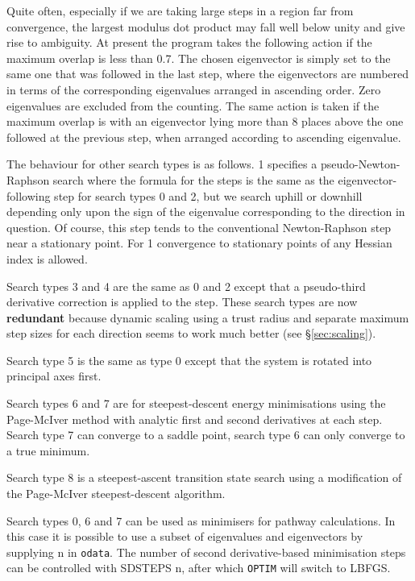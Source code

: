 {{{Quite often, especially if we are taking large steps in a region far from convergence,
the largest modulus dot product may fall well below unity and give rise to ambiguity.
At present the program takes the following action if the maximum overlap is less than
0.7. The chosen eigenvector is simply set to the same one that was followed in the last
step, where the eigenvectors are numbered in terms of the corresponding eigenvalues arranged in
ascending order. Zero eigenvalues are excluded from the counting. The same action is
taken if the maximum overlap is with an eigenvector lying more than 8 places above
the one followed at the previous step, when arranged according to ascending eigenvalue.

The behaviour for other search types is as follows.  1
specifies a pseudo-Newton-Raphson search where the formula for the steps is the same
as the eigenvector-following step for search types 0 and 2, but we search uphill or
downhill depending only upon the sign of the eigenvalue corresponding to the direction
in question.\cite{wales94a}
Of course, this step tends to the conventional Newton-Raphson step
near a stationary point. For  1 convergence to stationary points of any Hessian 
index is allowed.

Search types 3 and 4 are the same as 0 and 2 except that a pseudo-third derivative
correction is applied to the step\cite{wales94a}. These search types are now {\bf redundant}
because dynamic scaling using a trust radius and separate maximum step sizes for each
direction seems to work much better (see \S\ref{sec:scaling}).

Search type 5 is the same as type 0 except that the system is rotated into principal
axes first.

Search types 6 and 7 are for steepest-descent energy minimisations using the Page-McIver
method\cite{pagem88} with analytic first and second derivatives at each step. 
Search type 7 can converge to a saddle point, search type 6 can only converge to a true minimum.

Search type 8 is a steepest-ascent transition state search using a modification of
the Page-McIver steepest-descent algorithm.

Search types 0, 6 and 7 can be used as minimisers for pathway calculations.
In this case it is possible to use a subset of eigenvalues and eigenvectors
by supplying { n \/} in {\tt odata}.
The number of second derivative-based minimisation steps can be controlled
with {SDSTEPS n\/}, after which {\tt OPTIM} will switch to LBFGS.

}}}
